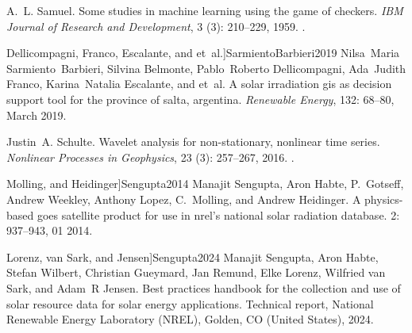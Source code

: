 \documentclass[letterpaper,12pt, twoside]{report}
\providecommand{\DIFdeltex}[1]{{\protect\color{red} \scriptsize #1}} %
\providecommand{\DIFdel}[1]{\texorpdfstring{\DIFdeltex{#1}}{}} %
\begin{document}
\DIFdel{A.~L. Samuel.
}%
\DIFdel{Some studies in machine learning using the game of checkers.
}%
\DIFdel{\emph{IBM Journal of Research and Development}, 3}%
\DIFdel{(3):}%
\DIFdel{210--229, 1959.
}%
\DIFdel{.
}%

  Dellicompagni, Franco, Escalante, and et~al.]{SarmientoBarbieri2019}
\DIFdel{Nilsa~Maria Sarmiento~Barbieri, Silvina Belmonte, Pablo~Roberto Dellicompagni,
  Ada~Judith Franco, Karina~Natalia Escalante, and et~al.
}%
\DIFdel{A solar irradiation gis as decision support tool for the province of
  salta, argentina.
}%
\DIFdel{\emph{Renewable Energy}, 132:}%
\DIFdel{68--80, March 2019.
}%

\DIFdel{Justin~A. Schulte.
}%
\DIFdel{Wavelet analysis for non-stationary, nonlinear time series.
}%
\DIFdel{\emph{Nonlinear Processes in Geophysics}, 23}%
\DIFdel{(3):}%
\DIFdel{257--267, 2016.
}%
\DIFdel{.
}%

  Molling, and Heidinger]{Sengupta2014}
\DIFdel{Manajit Sengupta, Aron Habte, P.~Gotseff, Andrew Weekley, Anthony Lopez,
  C.~Molling, and Andrew Heidinger.
}%
\DIFdel{A physics-based goes satellite product for use in nrel's national
  solar radiation database.
}%
\DIFdel{2:}%
\DIFdel{937--943, 01 2014.
}%

  Lorenz, van Sark, and Jensen]{Sengupta2024}
\DIFdel{Manajit Sengupta, Aron Habte, Stefan Wilbert, Christian Gueymard, Jan Remund,
  Elke Lorenz, Wilfried van Sark, and Adam~R Jensen.
}%
\DIFdel{Best practices handbook for the collection and use of solar resource
  data for solar energy applications.
}%
\DIFdel{Technical report, National Renewable Energy Laboratory (NREL),
  Golden, CO (United States), 2024.
}%
\end{document}
